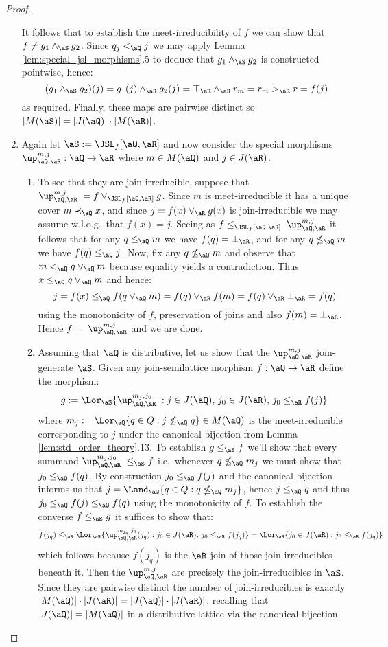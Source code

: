 \documentclass{article}
\begin{document}
\begin{proof}
\begin{enumerate}
 It follows that to establish the meet-irreducibility of $f$ we can show that $f \neq g_1 \land_\aS g_2$. Since $q_j <_\aQ j$ we may apply Lemma \ref{lem:special_jsl_morphisms}.5 to deduce that $g_1 \land_\aS g_2$ is constructed pointwise, hence:
\[
(g_1 \land_\aS g_2)(j)
= g_1(j) \land_\aR g_2(j)
= \top_\aR \land_\aR r_m
= r_m >_{\aR} r = f(j)
\]
as required. Finally, these maps are pairwise distinct so $|M(\aS)| = |J(\aQ)| \cdot |M(\aR)|$.

% 

\item
Again let $\aS := \JSL_f[\aQ,\aR]$ and now consider the special morphisms $\up_{\aQ,\aR}^{m,j} : \aQ \to \aR$ where $m \in M(\aQ)$ and $j \in J(\aR)$.
\begin{enumerate}
\item
To see that they are join-irreducible, suppose that $\up_{\aQ,\aR}^{m,j} \; = f \lor_{\JSL_f[\aQ,\aR]} g$. Since $m$ is meet-irreducible it has a unique cover $m \prec_\aQ x$, and since $j = f(x) \lor_\aR g(x)$ is join-irreducible we may assume w.l.o.g.\ that $f(x) = j$. Seeing as $f \leq_{\JSL_f[\aQ,\aR]} \; \up_{\aQ,\aR}^{m,j}$ it follows that for any $q \leq_\aQ m$ we have $f(q) = \bot_\aR$, and for any $q \nleq_\aQ m$ we have $f(q) \leq_\aQ j$. Now, fix any $q \nleq_\aQ m$ and observe that $m <_\aQ q \lor_\aQ m$ because equality yields a contradiction. Thus $x \leq_\aQ q \lor_\aQ m$ and hence:
\[
j 
= f(x) \leq_\aQ f(q \lor_\aQ m) 
= f(q) \lor_\aR f(m) 
= f(q) \lor_\aR \bot_\aR
= f(q)
\]
using the monotonicity of $f$, preservation of joins and also $f(m) = \bot_\aR$. Hence $f = \; \up_{\aQ,\aR}^{m,j}$ and we are done.

\item
Assuming that $\aQ$ is distributive, let us show that the $\up_{\aQ,\aR}^{m,j}$ join-generate $\aS$. Given any join-semilattice morphism $f : \aQ \to \aR$ define the morphism:
\[
g := \Lor_\aS \{ \up_{\aQ,\aR}^{m_j, j_0}  \; : j \in J(\aQ), \, j_0 \in J(\aR), \, j_0 \leq_\aR f(j) \}
\]
where $m_j := \Lor_\aQ \{ q \in Q : j \nleq_\aQ q \} \in M(\aQ)$ is the meet-irreducible corresponding to $j$ under the canonical bijection from Lemma \ref{lem:std_order_theory}.13. To establish $g \leq_\aS f$ we'll show that every summand $\up_{\aQ,\aR}^{m_j,j_0} \; \leq_\aS f$ i.e.\ whenever $q \nleq_\aQ m_j$ we must show that $j_0 \leq_\aQ f(q)$. By construction $j_0 \leq_\aQ f(j)$ and the canonical bijection informs us that $j = \Land_\aQ \{ q \in Q : q \nleq_\aQ m_j \}$, hence $j \leq_\aQ q$ and thus $j_0 \leq_\aQ f(j) \leq_\aQ f(q)$ using the monotonicity of $f$. To establish the converse $f \leq_\aS g$ it suffices to show that:
\[
f(j_q) 
\leq_\aR \Lor_\aR \{ \up_{\aQ,\aR}^{m_{j_q},j_0}(j_q) : j_0 \in J(\aR), \, j_0 \leq_\aR f(j_q) \}
= \Lor_\aR \{ j_0 \in J(\aR) : j_0 \leq_\aR f(j_q) \}
\]
which follows because $f(j_q)$ is the $\aR$-join of those join-irreducibles beneath it. Then the $\up_{\aQ,\aR}^{m,j}$ are precisely the join-irreducibles in $\aS$. Since they are pairwise distinct the number of join-irreducibles is exactly $|M(\aQ)| \cdot |J(\aR)| = |J(\aQ)| \cdot |J(\aR)|$, recalling that $|J(\aQ)| = |M(\aQ)|$ in a distributive lattice via the canonical bijection.


\end{enumerate}
\end{enumerate}
\end{proof}
\end{document}
